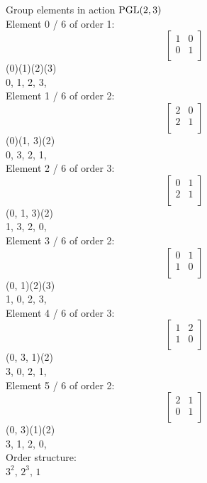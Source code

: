 Group elements in action ${\rm PGL}(2,3)$\\
Element     0 / 6 of order 1:
$$
\left[
\begin{array}{*{2}{r}}
1 & 0\\
0 & 1\\
\end{array}
\right]
$$
(0)(1)(2)(3)\\
0, 1, 2, 3, \\
Element     1 / 6 of order 2:
$$
\left[
\begin{array}{*{2}{r}}
2 & 0\\
2 & 1\\
\end{array}
\right]
$$
(0)(1, 3)(2)\\
0, 3, 2, 1, \\
Element     2 / 6 of order 3:
$$
\left[
\begin{array}{*{2}{r}}
0 & 1\\
2 & 1\\
\end{array}
\right]
$$
(0, 1, 3)(2)\\
1, 3, 2, 0, \\
Element     3 / 6 of order 2:
$$
\left[
\begin{array}{*{2}{r}}
0 & 1\\
1 & 0\\
\end{array}
\right]
$$
(0, 1)(2)(3)\\
1, 0, 2, 3, \\
Element     4 / 6 of order 3:
$$
\left[
\begin{array}{*{2}{r}}
1 & 2\\
1 & 0\\
\end{array}
\right]
$$
(0, 3, 1)(2)\\
3, 0, 2, 1, \\
Element     5 / 6 of order 2:
$$
\left[
\begin{array}{*{2}{r}}
2 & 1\\
0 & 1\\
\end{array}
\right]
$$
(0, 3)(1)(2)\\
3, 1, 2, 0, \\
Order structure:\\
$
3^2,\, 2^3,\, 1 $
\\
